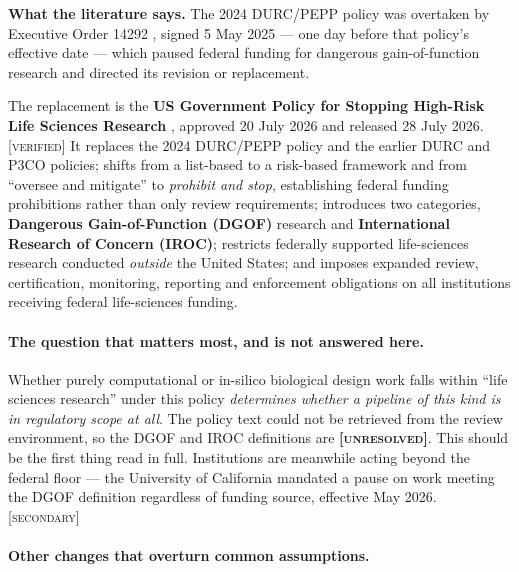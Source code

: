\documentclass[11pt,a4paper]{article}
\newcommand{\flag}[1]{\textcolor{flagcolor}{\textbf{#1}}}
\newcommand{\verified}{\textsc{[verified]}}
\newcommand{\secondary}{\textsc{[secondary]}}
\newcommand{\unresolved}{\flag{\textsc{[unresolved]}}}
\newcommand{\evidence}[1]{\par\smallskip\noindent\textbf{What the literature says.} #1}
\begin{document}
\evidence{The 2024 DURC/PEPP policy \citep{durcpepp2024} was overtaken by
Executive Order 14292 \citep{eo14292}, signed 5 May 2025 --- one day before
that policy's effective date --- which paused federal funding for dangerous
gain-of-function research and directed its revision or replacement.

The replacement is the \textbf{US Government Policy for Stopping High-Risk
Life Sciences Research} \citep{usgstopping2026}, approved 20 July 2026 and
released 28 July 2026. \verified{} It replaces the 2024 DURC/PEPP policy and
the earlier DURC and P3CO policies; shifts from a list-based to a risk-based
framework and from ``oversee and mitigate'' to \emph{prohibit and stop},
establishing federal funding prohibitions rather than only review
requirements; introduces two categories, \textbf{Dangerous
Gain-of-Function (DGOF)} research and \textbf{International Research of
Concern (IROC)}; restricts federally supported life-sciences research
conducted \emph{outside} the United States; and imposes expanded review,
certification, monitoring, reporting and enforcement obligations on all
institutions receiving federal life-sciences funding.}

\paragraph{The question that matters most, and is not answered here.}
Whether purely computational or in-silico biological design work falls
within ``life sciences research'' under this policy \emph{determines whether
a pipeline of this kind is in regulatory scope at all}. The policy text
could not be retrieved from the review environment, so the DGOF and IROC
definitions are \unresolved. This should be the first thing read in full.
Institutions are meanwhile acting beyond the federal floor --- the
University of California mandated a pause on work meeting the DGOF
definition regardless of funding source, effective May 2026. \secondary

\paragraph{Other changes that overturn common assumptions.}
\end{document}
